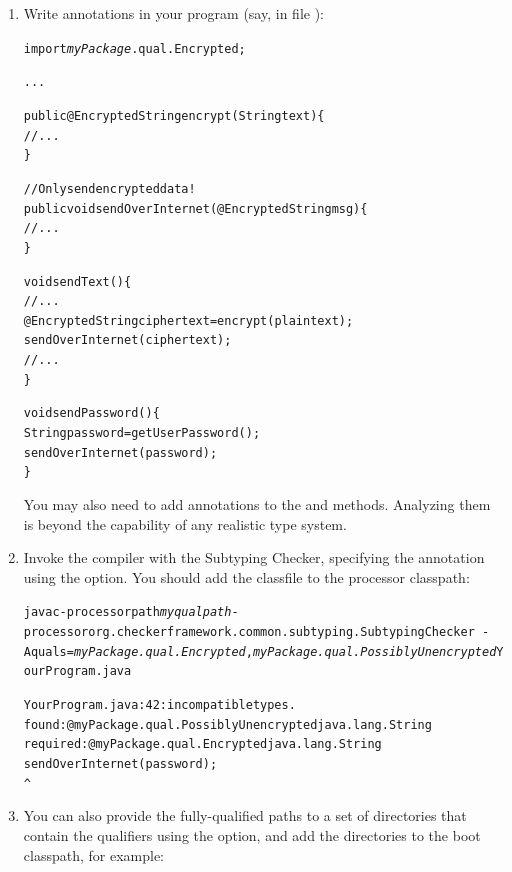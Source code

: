 \begin{enumerate}
\begin{Verbatim}
$ javac myPackage/qual/Encrypted.java myPackage/qual/PossiblyUnencrypted.java
\end{Verbatim}

The resulting \<.class> files should either be on the same path (the classpath or
processor path) as the Checker Framework.

\item
  Write  annotations in your program (say, in file
  ):

\begin{alltt}
import \textit{myPackage}.qual.Encrypted;

...

public @Encrypted String encrypt(String text) \{
    // ...
\}

// Only send encrypted data!
public void sendOverInternet(@Encrypted String msg) \{
    // ...
\}

void sendText() \{
    // ...
    @Encrypted String ciphertext = encrypt(plaintext);
    sendOverInternet(ciphertext);
    // ...
\}

void sendPassword() \{
    String password = getUserPassword();
    sendOverInternet(password);
\}
\end{alltt}

You may also need to add  annotations to the
 and  methods.  Analyzing them is beyond the
capability of any realistic type system.

\item
  Invoke the compiler with the Subtyping Checker, specifying the
   annotation using the  option.
  You should add the  classfile to the processor classpath:

\begin{alltt}
  javac -processorpath \textit{myqualpath} -processor org.checkerframework.common.subtyping.SubtypingChecker \
        -Aquals=\textit{myPackage.qual.Encrypted},\textit{myPackage.qual.PossiblyUnencrypted} YourProgram.java

YourProgram.java:42: incompatible types.
found   : @myPackage.qual.PossiblyUnencrypted java.lang.String
required: @myPackage.qual.Encrypted java.lang.String
    sendOverInternet(password);
                     ^
\end{alltt}

\item
You can also provide the fully-qualified paths to a set of directories
that contain the qualifiers using the \code{-AqualDirs} option, and add
the directories to the boot classpath, for example:


\end{enumerate}
